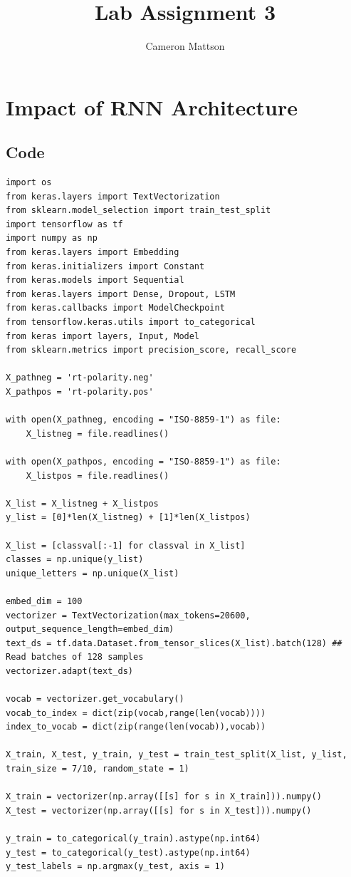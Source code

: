 \documentclass[12pt]{article}
\title{Lab Assignment 3}
\author{Cameron Mattson}
\begin{document}
\maketitle
\tableofcontents

\section{Impact of RNN Architecture}
\subsection{Code}
\begin{lstlisting}[breaklines]
import os
from keras.layers import TextVectorization
from sklearn.model_selection import train_test_split
import tensorflow as tf
import numpy as np
from keras.layers import Embedding
from keras.initializers import Constant
from keras.models import Sequential
from keras.layers import Dense, Dropout, LSTM
from keras.callbacks import ModelCheckpoint
from tensorflow.keras.utils import to_categorical
from keras import layers, Input, Model
from sklearn.metrics import precision_score, recall_score

X_pathneg = 'rt-polarity.neg'
X_pathpos = 'rt-polarity.pos'

with open(X_pathneg, encoding = "ISO-8859-1") as file:
    X_listneg = file.readlines()

with open(X_pathpos, encoding = "ISO-8859-1") as file:
    X_listpos = file.readlines()
 
X_list = X_listneg + X_listpos
y_list = [0]*len(X_listneg) + [1]*len(X_listpos)

X_list = [classval[:-1] for classval in X_list]
classes = np.unique(y_list)
unique_letters = np.unique(X_list)

embed_dim = 100
vectorizer = TextVectorization(max_tokens=20600, output_sequence_length=embed_dim)
text_ds = tf.data.Dataset.from_tensor_slices(X_list).batch(128) ## Read batches of 128 samples
vectorizer.adapt(text_ds)

vocab = vectorizer.get_vocabulary()
vocab_to_index = dict(zip(vocab,range(len(vocab))))
index_to_vocab = dict(zip(range(len(vocab)),vocab))

X_train, X_test, y_train, y_test = train_test_split(X_list, y_list, train_size = 7/10, random_state = 1)

X_train = vectorizer(np.array([[s] for s in X_train])).numpy()
X_test = vectorizer(np.array([[s] for s in X_test])).numpy()

y_train = to_categorical(y_train).astype(np.int64)
y_test = to_categorical(y_test).astype(np.int64)
y_test_labels = np.argmax(y_test, axis = 1)


\end{lstlisting}
\end{document}
